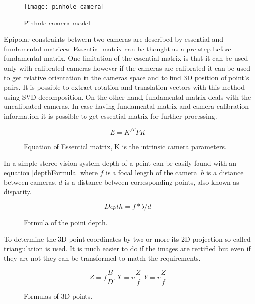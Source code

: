 \documentclass[../../../../main]{subfiles}
\begin{document}
\begin{figure} [ht]
    \begin{center}
        \texttt{[image: pinhole\_camera]}
        \caption{Pinhole camera model.}
        \label{fig:pinholeCamera}
    \end{center}
\end{figure}

Epipolar constraints between two cameras are described by essential and fundamental matrices. Essential matrix can be thought as a pre-step before fundamental matrix. One limitation of the essential matrix is that it can be used only with calibrated cameras however if the cameras are calibrated it can be used to get relative orientation in the cameras space and to find 3D position of point's pairs. It is possible to extract rotation and translation vectors with this method using \ac{SVD} decomposition. On the other hand, fundamental matrix deals with the uncalibrated cameras. In case having fundamental matrix and camera calibration information it is possible to get essential matrix for further processing. 

\begin{figure} [ht]
  \centering  
      \begin{equation}
         E = K'^TFK  
      \end{equation}
  \caption{Equation of Essential matrix, K is the intrinsic camera parameters. \parencite[see][p257]{Hartley2004}}
\end{figure}

In a simple stereo-vision system depth of a point can be easily found with an equation \ref{depthFormula} where $f$ is a focal length of the camera, $b$ is a distance between cameras, $d$ is a distance between corresponding points, also known as disparity.

\begin{figure} [ht]
  \centering  
      \begin{equation}
         Depth = f * b/d
         \label{depthFormula}
      \end{equation}
  \caption{Formula of the point depth.}
\end{figure}

To determine the 3D point coordinates by two or more its 2D projection so called triangulation is used. It is much easier to do if the images are rectified but even if they are not they can be transformed to match the requirements.

\begin{figure} [ht!]
  \centering  
      \begin{equation}
         Z = f\frac{B}{D}, X = u\frac{Z}{f}, Y = v\frac{Z}{f}
         \label{realCoordinatesFormula}
      \end{equation}
  \caption{Formulas of 3D points.}
\end{figure}
\end{document}
